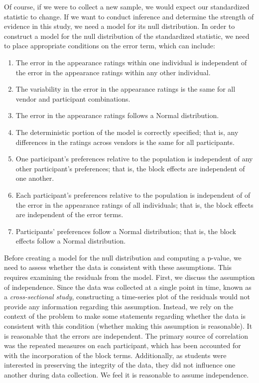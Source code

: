 \documentclass[
  letterpaper,
  DIV=11,
  numbers=noendperiod]{scrreprt}
\providecommand{\tightlist}{%
  \setlength{\itemsep}{0pt}\setlength{\parskip}{0pt}}\usepackage{longtable,booktabs,array}
\theoremstyle{definition}
\theoremstyle{definition}
\theoremstyle{plain}
\theoremstyle{remark}
\begin{document}
Of course, if we were to collect a new sample, we would expect our
standardized statistic to change. If we want to conduct inference and
determine the strength of evidence in this study, we need a model for
its null distribution. In order to construct a model for the null
distribution of the standardized statistic, we need to place appropriate
conditions on the error term, which can include:

\begin{enumerate}
\def\labelenumi{\arabic{enumi}.}
\tightlist
\item
  The error in the appearance ratings within one individual is
  independent of the error in the appearance ratings within any other
  individual.
\item
  The variability in the error in the appearance ratings is the same for
  all vendor and participant combinations.
\item
  The error in the appearance ratings follows a Normal distribution.
\item
  The deterministic portion of the model is correctly specified; that
  is, any differences in the ratings across vendors is the same for all
  participants.
\item
  One participant's preferences relative to the population is
  independent of any other participant's preferences; that is, the block
  effects are independent of one another.
\item
  Each participant's preferences relative to the population is
  independent of of the error in the appearance ratings of all
  individuals; that is, the block effects are independent of the error
  terms.
\item
  Participants' preferences follow a Normal distribution; that is, the
  block effects follow a Normal distribution.
\end{enumerate}

Before creating a model for the null distribution and computing a
p-value, we need to assess whether the data is consistent with these
assumptions. This requires examining the residuals from the model.
First, we discuss the assumption of independence. Since the data was
collected at a single point in time, known as a \emph{cross-sectional
study}, constructing a time-series plot of the residuals would not
provide any information regarding this assumption. Instead, we rely on
the context of the problem to make some statements regarding whether the
data is consistent with this condition (whether making this assumption
is reasonable). It is reasonable that the errors are independent. The
primary source of correlation was the repeated measures on each
participant, which has been accounted for with the incorporation of the
block terms. Additionally, as students were interested in preserving the
integrity of the data, they did not influence one another during data
collection. We feel it is reasonable to assume independence.
\end{document}
